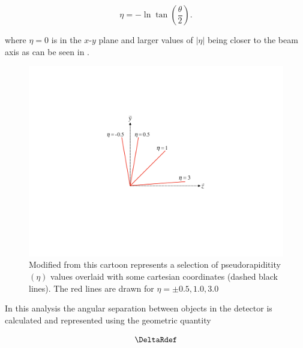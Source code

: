 \begin{equation}
 \eta = -\ln \tan \left( \frac{\theta}{2} \right).
\end{equation}

where $\eta = 0$ is in the $x$-$y$ plane and larger values of $|\eta|$ being
closer to the beam axis as can be seen in .

\begin{figure}[!htbp]
  \begin{center}
    \includegraphics[width=0.5\linewidth]{figures/atlas/pseudorapidity}
    \caption{Modified from \cite{Stark:2317296} this cartoon represents a
selection of pseudorapiditity $(\eta)$ values overlaid with some cartesian
coordinates (dashed black lines).  The red lines are drawn for $\eta = \pm
0.5,1.0,3.0$ }
    \label{fig:pseudorapidity}
  \end{center}
\end{figure}

In this analysis the angular separation between objects in the detector is
calculated and represented using the geometric quantity 

\begin{equation}
 \DeltaRdef
\end{equation}
